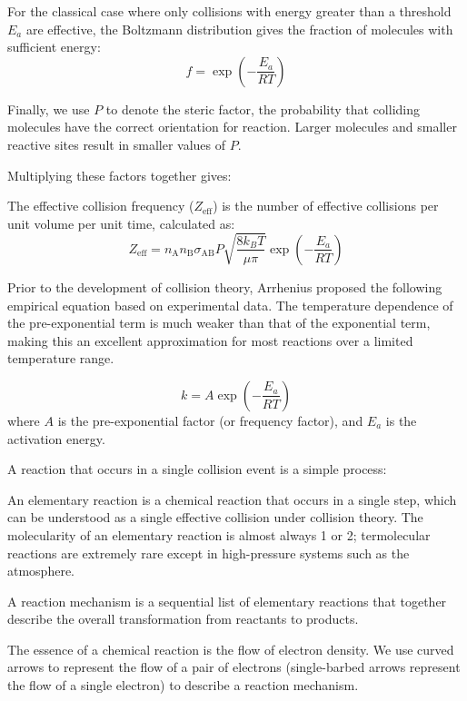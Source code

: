 For the classical case where only collisions with energy greater than a threshold $E_a$ are effective, the Boltzmann distribution gives the fraction of molecules with sufficient energy:
$$f = \exp \left(-\frac{E_a}{RT}\right)$$

Finally, we use $P$ to denote the steric factor, the probability that colliding molecules have the correct orientation for reaction. Larger molecules and smaller reactive sites result in smaller values of $P$.

Multiplying these factors together gives:

\begin{proposition}
The effective collision frequency ($Z_{\text{eff}}$) is the number of effective collisions per unit volume per unit time, calculated as:
$$Z_{\text{eff}} = n_{\text{A}} n_{\text{B}} \sigma_{\text{AB}} P \sqrt{\frac{8 k_B T}{\mu \pi} } \exp \left(-\frac{E_a}{RT}\right)$$
\end{proposition}

Prior to the development of collision theory, Arrhenius proposed the following empirical equation based on experimental data. The temperature dependence of the pre-exponential term is much weaker than that of the exponential term, making this an excellent approximation for most reactions over a limited temperature range.

\begin{proposition}
$$k = A\exp\left(-\frac{E_a}{RT}\right)$$
where $A$ is the pre-exponential factor (or frequency factor), and $E_a$ is the activation energy.
\end{proposition}

A reaction that occurs in a single collision event is a simple process:

\begin{definition}
An elementary reaction is a chemical reaction that occurs in a single step, which can be understood as a single effective collision under collision theory. The molecularity of an elementary reaction is almost always 1 or 2; termolecular reactions are extremely rare except in high-pressure systems such as the atmosphere.

A reaction mechanism is a sequential list of elementary reactions that together describe the overall transformation from reactants to products.
\end{definition}

The essence of a chemical reaction is the flow of electron density. We use curved arrows to represent the flow of a pair of electrons (single-barbed arrows represent the flow of a single electron) to describe a reaction mechanism.


